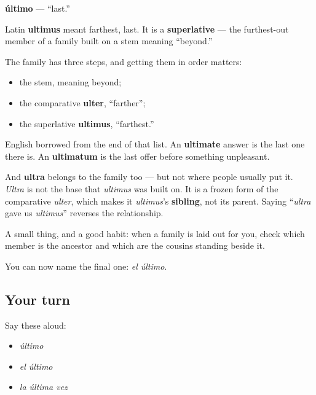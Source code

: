 \begin{cousinweb}
\textbf{último} — \textquotedblleft{}last.\textquotedblright{}

Latin \textbf{ultimus} meant farthest, last. It is a \textbf{superlative} — the furthest-out member of a family built on a stem meaning \textquotedblleft{}beyond.\textquotedblright{}

The family has three steps, and getting them in order matters:

\begin{itemize}
\raggedright
  \item the stem, meaning beyond;
  \item the comparative \textbf{ulter}, \textquotedblleft{}farther\textquotedblright{};
  \item the superlative \textbf{ultimus}, \textquotedblleft{}farthest.\textquotedblright{}
\end{itemize}

English borrowed from the end of that list. An \textbf{ultimate} answer is the last one there is. An \textbf{ultimatum} is the last offer before something unpleasant.

And \textbf{ultra} belongs to the family too — but not where people usually put it. \emph{Ultra} is not the base that \emph{ultimus} was built on. It is a frozen form of the comparative \emph{ulter}, which makes it \emph{ultimus}'s \textbf{sibling}, not its parent. Saying \textquotedblleft{}\emph{ultra} gave us \emph{ultimus}\textquotedblright{} reverses the relationship.

A small thing, and a good habit: when a family is laid out for you, check which member is the ancestor and which are the cousins standing beside it.
\end{cousinweb}

\begin{grammarlens}[title={What you've built}]
You can now name the final one: \emph{el último}.
\end{grammarlens}

\subsection*{Your turn}
Say these aloud:

\begin{itemize}
\raggedright
  \item \emph{último}
  \item \emph{el último}
  \item \emph{la última vez}
\end{itemize}


